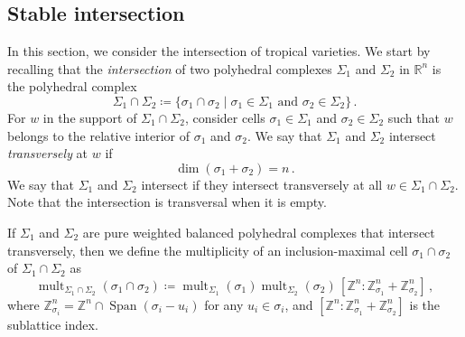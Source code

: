 \documentclass[11pt,reqno,a4paper]{amsart}
\numberwithin{equation}{section}
\theoremstyle{theoremstyle}
\theoremstyle{examplestyle}
\newcommand{\RR}{\mathbb{R}}
\newcommand{\ZZ}{\mathbb{Z}}
\DeclareMathOperator{\mult}{mult}
\DeclareMathOperator{\Span}{Span}
\newcommand{\term}{\bfemph}
\begin{document}
\subsection{Stable intersection}
\label{subsec:stable_intersection}
In this section, we consider the intersection of tropical varieties. We start by recalling that the \emph{intersection}  of  two polyhedral complexes    $\Sigma_1$ and $\Sigma_2$ in $\RR^n$
  is the polyhedral complex
  \begin{equation*}
\Sigma_1\cap\Sigma_2\coloneqq \{\sigma_1\cap\sigma_2\mid \sigma_1\in\Sigma_1 \text{ and } \sigma_2\in\Sigma_2\}\, .
  \end{equation*}
For $w$ in the support of $\Sigma_1\cap\Sigma_2$, consider cells $\sigma_1\in \Sigma_1$ and $\sigma_2\in \Sigma_2$ such that $w$ belongs to the relative interior of $\sigma_1$ and $\sigma_2$. We say that $\Sigma_1$ and $\Sigma_2$ intersect \emph{transversely} at   $w$ if 
\begin{equation}\label{eq:inter_transverse}
    \dim(\sigma_1+\sigma_2)=n \, .
\end{equation}   
  We say that $\Sigma_1$ and $\Sigma_2$ intersect  \term{transversely} if they intersect 
  transversely at all $w\in \Sigma_1\cap \Sigma_2$. 
Note that the intersection is transversal when it is empty. 


 If   $\Sigma_1$ and $\Sigma_2$ are pure  weighted balanced polyhedral complexes that intersect  transversely, then we define the multiplicity of an inclusion-maximal cell $\sigma_1\cap \sigma_2$ of $\Sigma_1\cap\Sigma_2$ as
 \begin{equation}\label{eq:intersection_multiplicities}
    \mult_{\Sigma_1\cap \Sigma_2}(\sigma_1\cap\sigma_2) \coloneqq \mult_{\Sigma_1}(\sigma_1) \mult_{\Sigma_2}(\sigma_2) \, [\ZZ^n:\ZZ^n_{\sigma_1}+\ZZ^n_{\sigma_2}]\,,
  \end{equation}
  where  $\ZZ^n_{\sigma_i}=\ZZ^n\cap \Span(\sigma_i-u_i)$ for any $u_i\in \sigma_i$, and $[\ZZ^n:\ZZ^n_{\sigma_1}+\ZZ^n_{\sigma_2}]$ is the sublattice index. 
 
\end{document}
